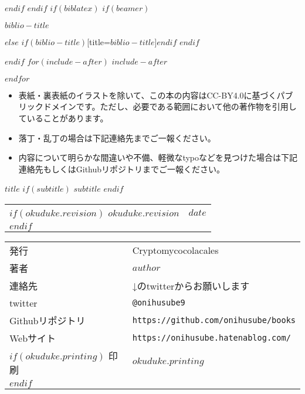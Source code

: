 $endif$
$endif$
$if(biblatex)$
$if(beamer)$
\begin{frame}[allowframebreaks]{$biblio-title$}
  \bibliographytrue
  \printbibliography[heading=none]
\end{frame}
$else$
\printbibliography$if(biblio-title)$[title=$biblio-title$]$endif$
$endif$

$endif$
$for(include-after)$
$include-after$

$endfor$


\clearpage

\pagestyle{empty}

\begin{itemize}
  \item 表紙・裏表紙のイラストを除いて、この本の内容はCC-BY4.0に基づくパブリックドメインです。ただし、必要である範囲において他の著作物を引用していることがあります。
  \item 落丁・乱丁の場合は下記連絡先までご一報ください。
  \item 内容について明らかな間違いや不備、軽微なtypoなどを見つけた場合は下記連絡先もしくはGithubリポジトリまでご一報ください。
\end{itemize}


\begin{center}
\textsf{$title$}
$if(subtitle)$
$subtitle$
$endif$

\begin{tabular}{ll}
$if(okuduke.revision)$
$okuduke.revision$ & $date$ \\
$endif$
\end{tabular}

\begin{tabular}{ll} \toprule
  発行      & Cryptomycocolacales \\
  著者      & $author$ \\
  連絡先    & ↓のtwitterからお願いします \\
  twitter  & \verb|@onihusube9| \\
  Githubリポジトリ  & \verb|https://github.com/onihusube/books| \\
  Webサイト & \verb|https://onihusube.hatenablog.com/| \\
  $if(okuduke.printing)$
  印刷      & $okuduke.printing$  \\
  $endif$
\end{tabular}
\end{center}

